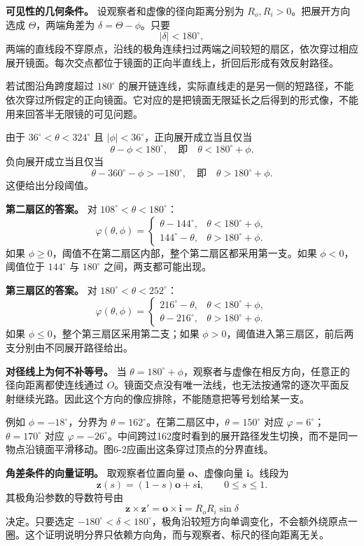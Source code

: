 \documentclass[12pt,a4paper,UTF8]{ctexart}
\begin{document}
\textbf{可见性的几何条件。} 设观察者和虚像的径向距离分别为
\(R_o,R_i>0\)。把展开方向选成 \(\Theta\)，两端角差为
\(\delta=\Theta-\phi\)。只要 \[
|\delta|<180^\circ,
\]
两端的直线段不穿原点，沿线的极角连续扫过两端之间较短的扇区，依次穿过相应展开镜面。每次交点都位于镜面的正向半直线上，折回后形成有效反射路径。

若试图沿角跨度超过 \(180^\circ\)
的展开链连线，实际直线走的是另一侧的短路径，不能依次穿过所假定的正向镜面。它对应的是把镜面无限延长之后得到的形式像，不能用来回答半无限镜的可见问题。

由于 \(36^\circ<\theta<324^\circ\) 且
\(|\phi|<36^\circ\)，正向展开成立当且仅当 \[
\theta-\phi<180^\circ,
\quad\text{即}\quad\theta<180^\circ+\phi.
\] 负向展开成立当且仅当 \[
\theta-360^\circ-\phi>-180^\circ,
\quad\text{即}\quad\theta>180^\circ+\phi.
\] 这便给出分段阈值。

\textbf{第二扇区的答案。} 对 \(108^\circ<\theta<180^\circ\)： \[
\boxed{
\varphi(\theta,\phi)=
\begin{cases}
\theta-144^\circ,&\theta<180^\circ+\phi,\\
144^\circ-\theta,&\theta>180^\circ+\phi.
\end{cases}}
\] 如果
\(\phi\ge0\)，阈值不在第二扇区内部，整个第二扇区都采用第一支。如果
\(\phi<0\)，阈值位于 \(144^\circ\) 与 \(180^\circ\)
之间，两支都可能出现。

\textbf{第三扇区的答案。} 对 \(180^\circ<\theta<252^\circ\)： \[
\boxed{
\varphi(\theta,\phi)=
\begin{cases}
216^\circ-\theta,&\theta<180^\circ+\phi,\\
\theta-216^\circ,&\theta>180^\circ+\phi.
\end{cases}}
\] 如果 \(\phi\le0\)，整个第三扇区采用第二支；如果
\(\phi>0\)，阈值进入第三扇区，前后两支分别由不同展开路径给出。

\textbf{对径线上为何不补等号。} 当
\(\theta=180^\circ+\phi\)，观察者与虚像在相反方向，任意正的径向距离都使连线通过
\(O\)。镜面交点没有唯一法线，也无法按通常的逐次平面反射继续光路。因此这个方向的像应排除，不能随意把等号划给某一支。

例如 \(\phi=-18^\circ\)，分界为
\(\theta=162^\circ\)。在第二扇区中，\(\theta=150^\circ\) 对应
\(\varphi=6^\circ\)；\(\theta=170^\circ\) 对应
\(\varphi=-26^\circ\)。中间跨过162度时看到的展开路径发生切换，而不是同一物点沿镜面平滑移动。图6-2应画出这条穿过顶点的分界直线。

\textbf{角差条件的向量证明。} 取观察者位置向量
\(\boldsymbol o\)、虚像向量 \(\boldsymbol i\)。线段为 \[
\boldsymbol z(s)=(1-s)\boldsymbol o+s\boldsymbol i,
\qquad0\le s\le1.
\] 其极角沿参数的导数符号由 \[
\boldsymbol z\times\boldsymbol z'
=\boldsymbol o\times\boldsymbol i
=R_oR_i\sin\delta
\] 决定。只要选定
\(-180^\circ<\delta<180^\circ\)，极角沿较短方向单调变化，不会额外绕原点一圈。这个证明说明分界只依赖方向角，而与观察者、标尺的径向距离无关。
\end{document}
